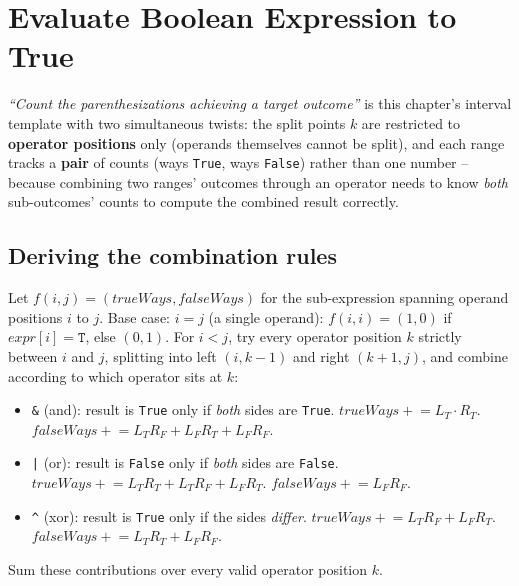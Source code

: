 \section{Evaluate Boolean Expression to True}
\label{sec:dp-evaluate-boolean-expression}


\begin{patternbox}
\emph{``Count the parenthesizations achieving a target outcome''} is
this chapter's interval template with two simultaneous twists: the
split points $k$ are restricted to \textbf{operator positions} only
(operands themselves cannot be split), and each range tracks a
\textbf{pair} of counts (ways \texttt{True}, ways \texttt{False})
rather than one number -- because combining two ranges' outcomes through
an operator needs to know \emph{both} sub-outcomes' counts to compute
the combined result correctly.
\end{patternbox}

\subsection*{Deriving the combination rules}

Let $f(i,j) = (\textit{trueWays}, \textit{falseWays})$ for the
sub-expression spanning operand positions $i$ to $j$. Base case:
$i=j$ (a single operand): $f(i,i) = (1,0)$ if $\textit{expr}[i]=
\texttt{T}$, else $(0,1)$. For $i<j$, try every operator position $k$
strictly between $i$ and $j$, splitting into left $(i,k{-}1)$ and right
$(k{+}1,j)$, and combine according to which operator sits at $k$:

\begin{itemize}
  \item \texttt{\&} (and): result is \texttt{True} only if
        \emph{both} sides are \texttt{True}.
        $\textit{trueWays} \mathrel{+}= L_T \cdot R_T$.
        $\textit{falseWays} \mathrel{+}= L_T R_F + L_F R_T + L_F R_F$.
  \item \texttt{|} (or): result is \texttt{False} only if \emph{both}
        sides are \texttt{False}.
        $\textit{trueWays} \mathrel{+}= L_T R_T + L_T R_F + L_F R_T$.
        $\textit{falseWays} \mathrel{+}= L_F R_F$.
  \item \texttt{\^{}} (xor): result is \texttt{True} only if the sides
        \emph{differ}.
        $\textit{trueWays} \mathrel{+}= L_T R_F + L_F R_T$.
        $\textit{falseWays} \mathrel{+}= L_T R_T + L_F R_F$.
\end{itemize}
Sum these contributions over every valid operator position $k$.

